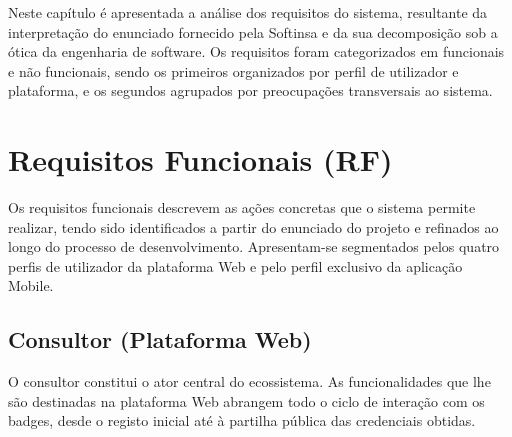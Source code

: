 \documentclass[12pt,a4paper]{report}
\begin{document}
Neste capítulo é apresentada a análise dos requisitos do sistema, resultante da interpretação do enunciado fornecido pela Softinsa e da sua decomposição sob a ótica da engenharia de software. Os requisitos foram categorizados em funcionais e não funcionais, sendo os primeiros organizados por perfil de utilizador e plataforma, e os segundos agrupados por preocupações transversais ao sistema.

\section{Requisitos Funcionais (RF)}

Os requisitos funcionais descrevem as ações concretas que o sistema permite realizar, tendo sido identificados a partir do enunciado do projeto e refinados ao longo do processo de desenvolvimento. Apresentam-se segmentados pelos quatro perfis de utilizador da plataforma Web e pelo perfil exclusivo da aplicação Mobile.

\subsection{Consultor (Plataforma Web)}

O consultor constitui o ator central do ecossistema. As funcionalidades que lhe são destinadas na plataforma Web abrangem todo o ciclo de interação com os badges, desde o registo inicial até à partilha pública das credenciais obtidas.
\end{document}
